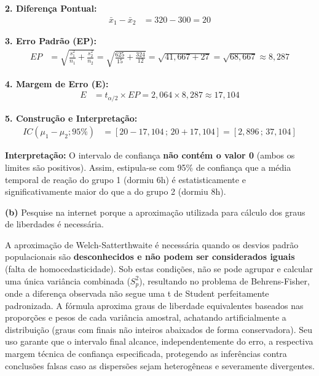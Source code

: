 \documentclass[12pt, a4paper]{article}
\begin{document}
\noindent \textbf{2. Diferença Pontual:}
\begin{align*}
\bar{x}_1 - \bar{x}_2 &= 320 - 300 = \boxed{20}
\end{align*}

\noindent \textbf{3. Erro Padrão (EP):}
\begin{align*}
EP &= \sqrt{\frac{s_1^2}{n_1} + \frac{s_2^2}{n_2}} = \sqrt{\frac{625}{15} + \frac{324}{12}} = \sqrt{41,667 + 27} = \sqrt{68,667} \approx \boxed{8,287}
\end{align*}

\noindent \textbf{4. Margem de Erro (E):}
\begin{align*}
E &= t_{\alpha/2} \times EP = 2,064 \times 8,287 \approx \boxed{17,104}
\end{align*}

\noindent \textbf{5. Construção e Interpretação:}
\begin{align*}
IC(\mu_1 - \mu_2; 95\%) &= [20 - 17,104 \,;\, 20 + 17,104] = \boxed{[2,896 \,;\, 37,104]}
\end{align*}

\noindent \textbf{Interpretação:} O intervalo de confiança \textbf{não contém o valor 0} (ambos os limites são positivos). Assim, estipula-se com 95\% de confiança que a média temporal de reação do grupo 1 (dormiu 6h) é estatisticamente e significativamente maior do que a do grupo 2 (dormiu 8h).

\medskip\noindent\textbf{(b)} Pesquise na internet porque a aproximação utilizada para cálculo dos graus de liberdades é necessária.

\noindent A aproximação de Welch-Satterthwaite é necessária quando os desvios padrão populacionais são \textbf{desconhecidos e não podem ser considerados iguais} (falta de homocedasticidade). Sob estas condições, não se pode agrupar e calcular uma única variância combinada ($S^2_p$), resultando no problema de Behrens-Fisher, onde a diferença observada não segue uma t de Student perfeitamente padronizada. A fórmula aproxima graus de liberdade equivalentes baseados nas proporções e pesos de cada variância amostral, achatando artificialmente a distribuição (graus com finais não inteiros abaixados de forma conservadora). Seu uso garante que o intervalo final alcance, independentemente do erro, a respectiva margem técnica de confiança especificada, protegendo as inferências contra conclusões falsas caso as dispersões sejam heterogêneas e severamente divergentes.

\end{document}
